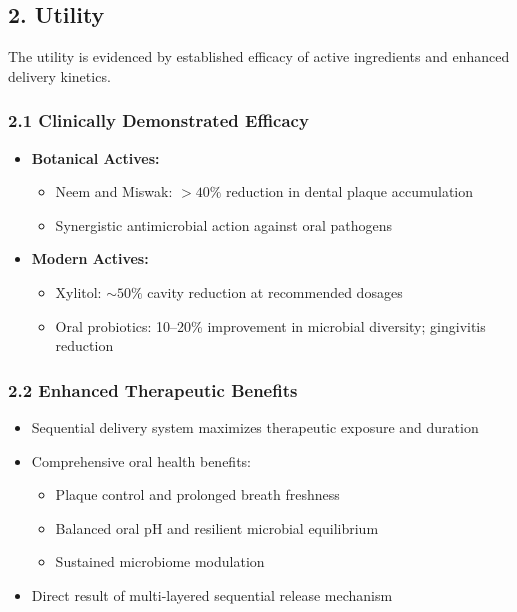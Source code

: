 \documentclass[12pt]{article}
\begin{document}
\subsection*{2. Utility}
The utility is evidenced by established efficacy of active ingredients and enhanced delivery kinetics.

\subsubsection*{2.1 Clinically Demonstrated Efficacy}
\begin{itemize}
    \item \textbf{Botanical Actives:}
    \begin{itemize}
        \item Neem and Miswak: $>40\%$ reduction in dental plaque accumulation
        \item Synergistic antimicrobial action against oral pathogens
    \end{itemize}
    \item \textbf{Modern Actives:}
    \begin{itemize}
        \item Xylitol: $\sim50\%$ cavity reduction at recommended dosages
        \item Oral probiotics: 10--20\% improvement in microbial diversity; gingivitis reduction \cite{Mosaico2022}
    \end{itemize}
\end{itemize}

\subsubsection*{2.2 Enhanced Therapeutic Benefits}
\begin{itemize}
    \item Sequential delivery system maximizes therapeutic exposure and duration
    \item Comprehensive oral health benefits:
    \begin{itemize}
        \item Plaque control and prolonged breath freshness
        \item Balanced oral pH and resilient microbial equilibrium
        \item Sustained microbiome modulation
    \end{itemize}
    \item Direct result of multi-layered sequential release mechanism
\end{itemize}
\end{document}
